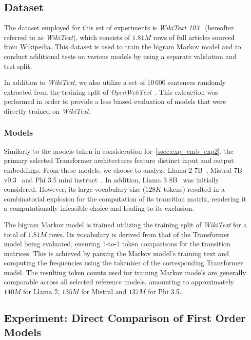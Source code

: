 \subsection{Dataset}\label{ssec:exp_fom_dataset}

The dataset employed for this set of experiments is \emph{WikiText 103}~\cite{merity2017} (hereafter referred to as \emph{WikiText}), which consists of $1.81M$ rows of full articles sourced from Wikipedia.
This dataset is used to train the bigram Markov model and to conduct additional tests on various models by using a separate validation and test split.

In addition to \emph{WikiText}, we also utilize a set of $10\,000$ sentences randomly extracted from the training split of \emph{OpenWebText}~\cite{gokaslan2019}.
This extraction was performed in order to provide a less biased evaluation of models that were directly trained on \emph{WikiText}.

\subsubsection{Models}

Similarly to the models taken in consideration for~\cref{ssec:exp_emb_exp2}, the primary selected Transformer architectures feature distinct input and output embeddings.
From these models, we choose to analyze Llama 2 7B~\cite{touvron2023}, Mistral 7B v0.3~\cite{jiang2023} and Phi 3.5 mini instruct~\cite{abdin2024}.
In addition, Llama 3 8B~\cite{dubey2024} was initially considered.
However, its large vocabulary size ($128K$ tokens) resulted in a combinatorial explosion for the computation of its transition matrix, rendering it a computationally infeasible choice and leading to its exclusion.

The bigram Markov model is trained utilizing the training split of \emph{WikiText} for a total of $1.81M$ rows.
Its vocabulary is derived from that of the Transformer model being evaluated, ensuring 1-to-1 token comparisons for the transition matrices.
This is achieved by parsing the Markov model's training text and computing the frequencies using the tokenizer of the corresponding Transformer model.
The resulting token counts used for training Markov models are generally comparable across all selected reference models, amounting to approximately $140M$ for Llama 2, $135M$ for Mistral and $137M$ for Phi 3.5.

\subsection{Experiment: Direct Comparison of First \texorpdfstring{\linebreak}{} Order Models}\label{ssec:exp_fom_exp1}

